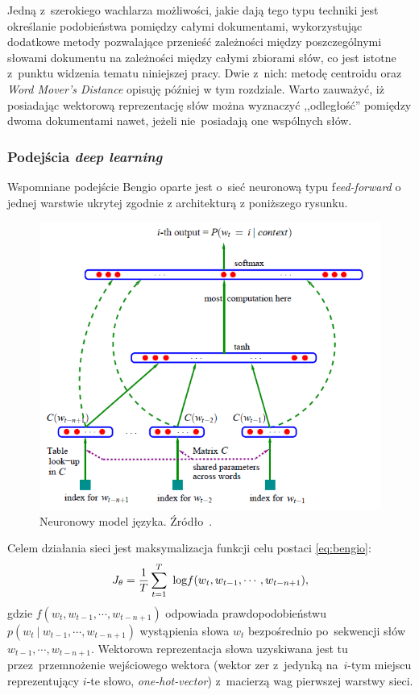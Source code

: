 \documentclass[pl]{minipw} %
\begin{document}
Jedną z~szerokiego wachlarza możliwości, jakie dają tego typu techniki jest określanie podobieństwa pomiędzy całymi dokumentami, wykorzystując dodatkowe metody pozwalające przenieść zależności między poszczególnymi słowami dokumentu na zależności między całymi zbiorami słów, co jest istotne z~punktu widzenia tematu niniejszej pracy. Dwie z~nich: metodę centroidu oraz \textit{Word Mover's Distance} opisuję później w tym rozdziale. Warto zauważyć, iż posiadając wektorową reprezentację słów można wyznaczyć ,,odległość'' pomiędzy dwoma dokumentami nawet, jeżeli nie~posiadają one wspólnych słów.


\subsubsection{Podejścia \textit{deep learning}}

Wspomniane podejście Bengio oparte jest o~sieć neuronową typu f\textit{eed-forward} o jednej warstwie ukrytej zgodnie z architekturą z poniższego rysunku.

\begin{figure}[H]
	\centering
	\includegraphics[width=1\textwidth]{img/bengio_language_model.png}
	\caption{Neuronowy model języka. Źródło~\cite{bengio}.}
\end{figure}

Celem działania sieci jest maksymalizacja funkcji celu postaci \ref{eq:bengio}:
\begin{equation}
\label{eq:bengio}
J_\theta = \frac{1}{T}\sum\limits_{t=1}^T\ \text{log} \space f(w_t , w_{t-1} , \cdots , w_{t-n+1}),
\end{equation}
gdzie $f(w_t , w_{t-1} , \cdots , w_{t-n+1})$ odpowiada prawdopodobieństwu $p(w_t \: | \: w_{t-1} , \cdots , w_{t-n+1})$ wystąpienia słowa $w_t$ bezpośrednio po~sekwencji słów $w_{t-1} , \cdots , w_{t-n+1}$. Wektorowa reprezentacja słowa uzyskiwana jest tu przez~przemnożenie wejściowego wektora (wektor zer z~jedynką na~$i$-tym miejscu reprezentujący $i$-te słowo, \textit{one-hot-vector}) z~macierzą wag pierwszej warstwy sieci.
\end{document}
